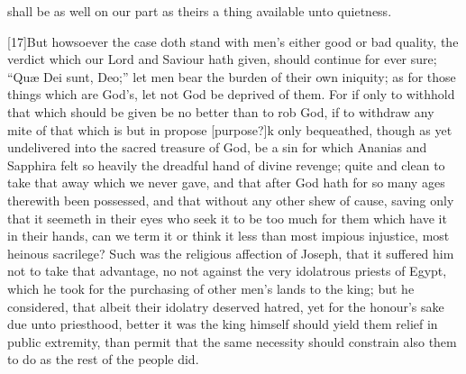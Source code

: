 shall be as well on our part as theirs a thing available unto quietness.

[17]But howsoever the case doth stand with men’s either good or bad quality, the verdict which our Lord and Saviour hath given, should continue for ever sure; “Quæ Dei sunt, Deo;” let men bear the burden of their own iniquity; as for those things which are God’s, let not God be deprived of them. For if only to withhold that which should be given be no better than to rob God, if to withdraw any mite of that which is but in propose [purpose?]k only bequeathed, though as yet undelivered into the sacred treasure of God, be a sin for which Ananias and Sapphira felt so heavily the dreadful hand of divine revenge; quite and clean to take that away which we never gave, and that after God hath for so many ages therewith been possessed, and that without any other shew of cause, saving only that it seemeth in their eyes who seek it to be too much for them which have it in their  hands, can we term it or think it less than most impious injustice, most heinous sacrilege? Such was the religious affection of Joseph, that it suffered him not to take that advantage, no not against the very idolatrous priests of Egypt, which he took for the purchasing of other men’s lands to the king; but he considered, that albeit their idolatry deserved hatred, yet for the honour’s sake due unto priesthood, better it was the king himself should yield them relief in public extremity, than permit that the same necessity should constrain also them to do as the rest of the people did.

